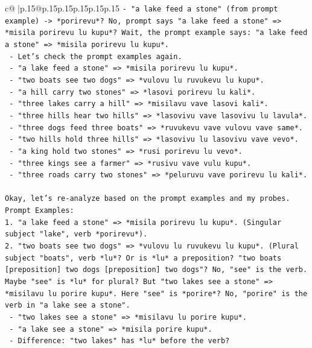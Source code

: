 \documentclass{article}
\begin{document}
{\begin{supertabular}{c@{$\;$}|p{.15\linewidth}@{}p{.15\linewidth}p{.15\linewidth}p{.15\linewidth}p{.15\linewidth}p{.15\linewidth}}
{{{\texttt{{-} "a lake feed a stone" (from prompt example) {-}> *porirevu*? No, prompt says "a lake feed a stone" => *misila porirevu lu kupu*? Wait, the prompt example says: "a lake feed a stone" => *misila porirevu lu kupu*.} \\
\texttt{  {-} Let's check the prompt examples again.} \\
\texttt{  {-} "a lake feed a stone" => *misila porirevu lu kupu*.} \\
\texttt{  {-} "two boats see two dogs" => *vulovu lu ruvukevu lu kupu*.} \\
\texttt{  {-} "a hill carry two stones" => *lasovi porirevu lu kali*.} \\
\texttt{  {-} "three lakes carry a hill" => *misilavu vave lasovi kali*.} \\
\texttt{  {-} "three hills hear two hills" => *lasovivu vave lasovivu lu lavula*.} \\
\texttt{  {-} "three dogs feed three boats" => *ruvukevu vave vulovu vave same*.} \\
\texttt{  {-} "two hills hold three hills" => *lasovivu lu lasovivu vave vevo*.} \\
\texttt{  {-} "a king hold two stones" => *rusi porirevu lu vevo*.} \\
\texttt{  {-} "three kings see a farmer" => *rusivu vave vulu kupu*.} \\
\texttt{  {-} "three roads carry two stones" => *peluruvu vave porirevu lu kali*.} \\
\\ 
\texttt{Okay, let's re{-}analyze based on the prompt examples and my probes.} \\
\texttt{Prompt Examples:} \\
\texttt{1. "a lake feed a stone" => *misila porirevu lu kupu*. (Singular subject "lake", verb *porirevu*).} \\
\texttt{2. "two boats see two dogs" => *vulovu lu ruvukevu lu kupu*. (Plural subject "boats", verb *lu*? Or is *lu* a preposition? "two boats {[}preposition{]} two dogs {[}preposition{]} two dogs"? No, "see" is the verb. Maybe "see" is *lu* for plural? But "two lakes see a stone" => *misilavu lu porire kupu*. Here "see" is *porire*? No, "porire" is the verb in "a lake see a stone".} \\
\texttt{   {-} "two lakes see a stone" => *misilavu lu porire kupu*.} \\
\texttt{   {-} "a lake see a stone" => *misila porire kupu*.} \\
\texttt{   {-} Difference: "two lakes" has *lu* before the verb?} \\
}}}
\end{supertabular}}
\end{document}
